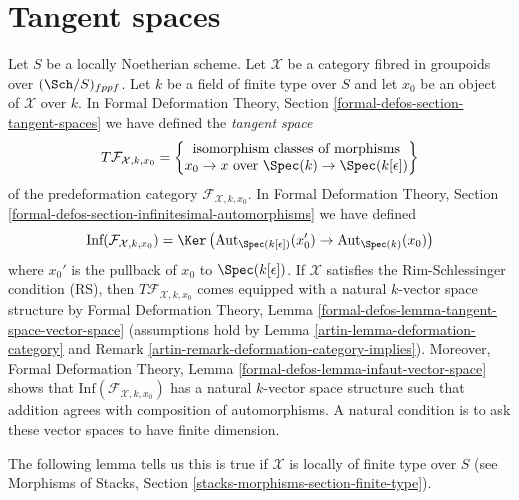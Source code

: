 \section{Tangent spaces}
\label{artin-section-tangent-spaces}
Let $S$ be a locally Noetherian scheme. Let $\mathcal{X}$ be a category
fibred in groupoids over $(\Sch/S)_{fppf}$. Let $k$ be a field of finite
type over $S$ and let $x_0$ be an object of $\mathcal{X}$ over $k$.
In Formal Deformation Theory, Section \ref{formal-defos-section-tangent-spaces}
we have defined the {\it tangent space}
\begin{equation}
\label{equation-tangent-space}
T\mathcal{F}_{\mathcal{X}, k, x_0} =
\left\{
\begin{matrix}
\text{isomorphism classes of morphisms}\\
x_0 \to x\text{ over }\Spec(k) \to \Spec(k[\epsilon])
\end{matrix}
\right\}
\end{equation}
of the predeformation category $\mathcal{F}_{\mathcal{X}, k, x_0}$.
In Formal Deformation Theory, Section
\ref{formal-defos-section-infinitesimal-automorphisms}
we have defined
\begin{equation}
\label{equation-infinitesimal-automorphisms}
\text{Inf}(\mathcal{F}_{\mathcal{X}, k, x_0}) =
\Ker\left(
\text{Aut}_{\Spec(k[\epsilon])}(x'_0) \to \text{Aut}_{\Spec(k)}(x_0)
\right)
\end{equation}
where $x_0'$ is the pullback of $x_0$ to $\Spec(k[\epsilon])$.
If $\mathcal{X}$ satisfies the Rim-Schlessinger condition (RS), then
$T\mathcal{F}_{\mathcal{X}, k, x_0}$ comes equipped with a natural
$k$-vector space structure by Formal Deformation Theory, Lemma
\ref{formal-defos-lemma-tangent-space-vector-space}
(assumptions hold by Lemma \ref{artin-lemma-deformation-category} and
Remark \ref{artin-remark-deformation-category-implies}). Moreover,
Formal Deformation Theory, Lemma \ref{formal-defos-lemma-infaut-vector-space}
shows that $\text{Inf}(\mathcal{F}_{\mathcal{X}, k, x_0})$ has a
natural $k$-vector space structure such that addition agrees with
composition of automorphisms. A natural condition
is to ask these vector spaces to have finite dimension.

\medskip\noindent
The following lemma tells us this is true if
$\mathcal{X}$ is locally of finite type over $S$ (see
Morphisms of Stacks, Section \ref{stacks-morphisms-section-finite-type}).

